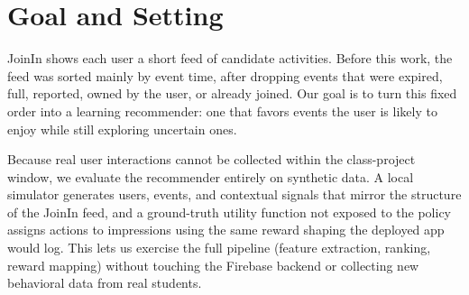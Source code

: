 \documentclass{article}
\begin{document}

\printAffiliationsAndNotice{}

\begin{abstract}
We build a reinforcement-learning event recommender for JoinIn, a Flutter/Firebase app where students find activities through a swipe feed. The existing Firestore query stays as a hard filter, and a Contextual Thompson Sampling re-ranker decides the order of the events that pass it. Ranking uses user, event, time, popularity, and safety features that the app already stores. User actions map to shaped rewards. For this class project we leave the remote logging hooks as no-ops and evaluate the policy offline with a synthetic simulator, instead of changing the Firebase backend.
\end{abstract}

\section{Goal and Setting}
JoinIn shows each user a short feed of candidate activities. Before this work, the feed was sorted mainly by event time, after dropping events that were expired, full, reported, owned by the user, or already joined. Our goal is to turn this fixed order into a learning recommender: one that favors events the user is likely to enjoy while still exploring uncertain ones.

Because real user interactions cannot be collected within the class-project window, we evaluate the recommender entirely on synthetic data. A local simulator generates users, events, and contextual signals that mirror the structure of the JoinIn feed, and a ground-truth utility function not exposed to the policy assigns actions to impressions using the same reward shaping the deployed app would log. This lets us exercise the full pipeline (feature extraction, ranking, reward mapping) without touching the Firebase backend or collecting new behavioral data from real students.
\end{document}
